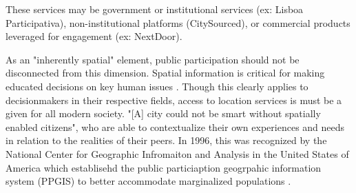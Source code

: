 These services may be government or institutional services (ex: Lisboa Participativa), non-institutional platforms (CitySourced), or commercial products leveraged for engagement (ex: NextDoor). %

As an "inherently spatial" element, public participation should not be disconnected from this dimension\cite{Acedo2019}. %
Spatial information is critical for making educated decisions on key human issues \cite{Rajabifard2009}.%
Though this clearly applies to decisionmakers in their respective fields, access to location services is must be a given for all modern society\cite{Rajabifard2009}. %
 "[A] city could not be smart without spatially enabled citizens"\cite{Roche2012}, %
who are able to contextualize their own experiences and needs in relation to the realities of their peers.
In 1996, this was recognized by the National Center for Geographic Infromaiton and Analysis in the United States of America which establisehd the public particiaption geogrpahic information system (PPGIS) to better accommodate marginalized populations \cite{Brown2012}. %
